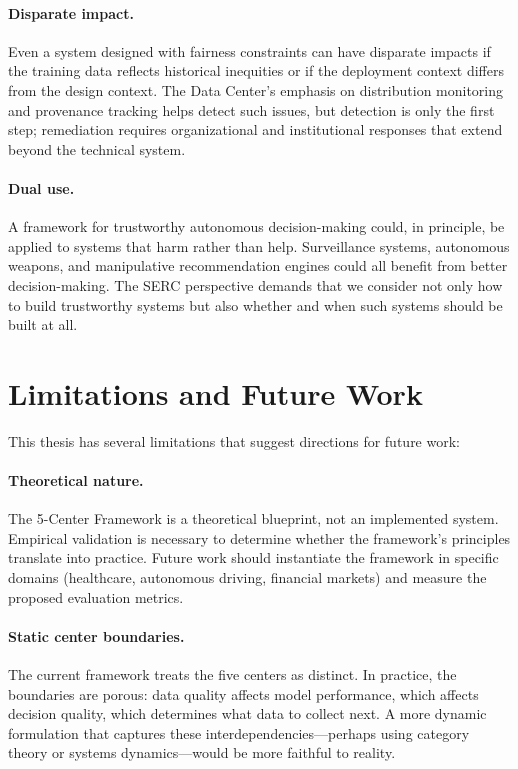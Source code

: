 \documentclass[11pt,a4paper]{article}
\begin{document}
\paragraph{Disparate impact.} Even a system designed with fairness constraints can have disparate impacts if the training data reflects historical inequities or if the deployment context differs from the design context. The Data Center's emphasis on distribution monitoring and provenance tracking helps detect such issues, but detection is only the first step; remediation requires organizational and institutional responses that extend beyond the technical system.

\paragraph{Dual use.} A framework for trustworthy autonomous decision-making could, in principle, be applied to systems that harm rather than help. Surveillance systems, autonomous weapons, and manipulative recommendation engines could all benefit from better decision-making. The SERC perspective demands that we consider not only how to build trustworthy systems but also whether and when such systems should be built at all.

\section{Limitations and Future Work}
\label{sec:limitations}

This thesis has several limitations that suggest directions for future work:

\paragraph{Theoretical nature.} The 5-Center Framework is a theoretical blueprint, not an implemented system. Empirical validation is necessary to determine whether the framework's principles translate into practice. Future work should instantiate the framework in specific domains (healthcare, autonomous driving, financial markets) and measure the proposed evaluation metrics.

\paragraph{Static center boundaries.} The current framework treats the five centers as distinct. In practice, the boundaries are porous: data quality affects model performance, which affects decision quality, which determines what data to collect next. A more dynamic formulation that captures these interdependencies---perhaps using category theory or systems dynamics---would be more faithful to reality.
\end{document}

